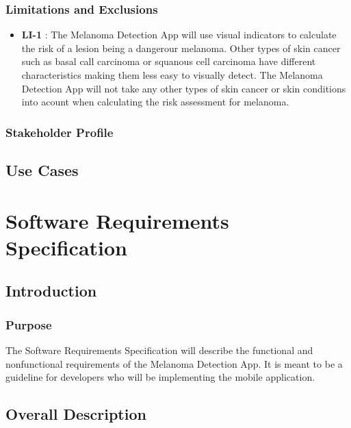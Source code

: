     \subsubsection{Limitations and Exclusions}

        \noindent
        \begin{itemize}[leftmargin=*]
            \item[]  \textbf{LI-1} : The Melanoma Detection App will use visual indicators to calculate the risk of a lesion being a dangerour melanoma. Other types of skin cancer such as basal call carcinoma or squanous cell carcinoma have different characteristics making them less easy to visually detect. The Melanoma Detection App will not take any other types of skin cancer or skin conditions into acount when calculating the risk assessment for melanoma.

        \end{itemize}

    \subsubsection{Stakeholder Profile}



    \subsection{Use Cases}
        


\section{Software Requirements Specification}

    \subsection{Introduction}
        \subsubsection{Purpose}

            The Software Requirements Specification will describe the functional and nonfunctional requirements of the Melanoma Detection App. It is meant to be a guideline for developers who will be implementing the mobile application.

    \subsection{Overall Description}
        

